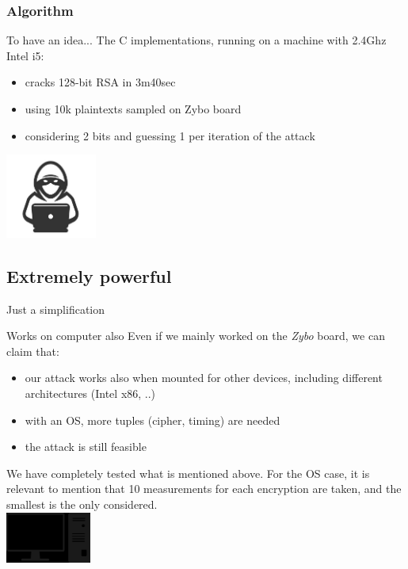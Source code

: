 \documentclass[aspectratio=43]{beamer}
\begin{document}
\begin{frame}[fragile]
    \frametitle{Algorithm}
    \begin{block}{To have an idea...}
        The C implementations, running on a machine with 2.4Ghz Intel i5:
        \begin{itemize}
            \pause \item cracks 128-bit RSA in 3m40sec
            \pause \item using 10k plaintexts sampled on Zybo board
            \pause \item considering 2 bits and guessing 1 per iteration of the attack
        \end{itemize}
    \end{block}
    \hfill \includegraphics[width=3cm]{./graphics/hacker}
\end{frame}

\subsection{Extremely powerful}
\begin{frame}{Just a simplification}
	\begin{block}{Works on computer also}
		Even if we mainly worked on the \textit{Zybo} board, we can claim that:
		\begin{itemize}
			\pause \item our attack works also when mounted for other devices, including different architectures (Intel x86, ..)
			\pause \item with an OS, more tuples (cipher, timing) are needed
			\pause \item the attack is still feasible
		\end{itemize}
    We have completely tested what is mentioned above. For the OS case, it is relevant to mention that 10 measurements for each encryption are taken, and the smallest is the only considered.\\
    \hfill
    \includegraphics[width=2.8cm]{./graphics/pc}
	\end{block}
\end{frame}
\end{document}
